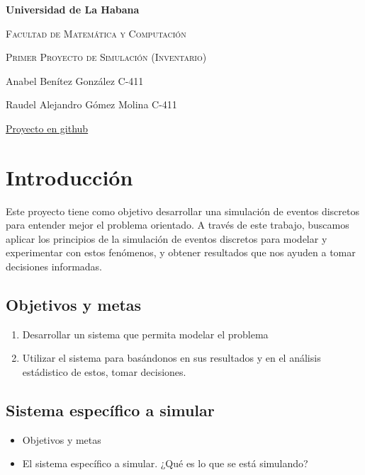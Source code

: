 \documentclass{article}
\begin{document}
\begin{titlepage}
    \centering
    {\bfseries\LARGE Universidad de La Habana \par}
    \vspace{1cm}
    {\scshape\Large Facultad de Matemática y Computación \par}
    \vspace{3cm}
    {\scshape\Huge Primer Proyecto de Simulación (Inventario) \par}
    \vfill

    {\Large Anabel Benítez González C-411 \par}
    {\Large Raudel Alejandro Gómez Molina C-411 \par}
    \vfill
    {\href{https://github.com/anabel02/discrete-event-simulation}{Proyecto en github} \par}
\end{titlepage}

\section*{Introducción}

Este proyecto tiene como objetivo desarrollar una simulación de eventos discretos para entender mejor el problema orientado.
A través de este trabajo, buscamos aplicar los principios de la simulación de eventos discretos para modelar
y experimentar con estos fenómenos, y obtener resultados que nos ayuden a tomar decisiones informadas.


\subsection*{Objetivos y metas}
\begin{enumerate}
    \item Desarrollar un sistema que permita modelar el problema
    \item Utilizar el sistema para basándonos en sus resultados y en el análisis estádistico de estos, tomar decisiones.
\end{enumerate}

\subsection*{Sistema específico a simular}

\begin{itemize}
    \item Objetivos y metas
    \item El sistema específico a simular. ¿Qué es lo que se está simulando?
\end{itemize}
\end{document}
